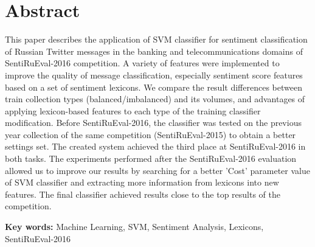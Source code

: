 \section{Abstract}
This paper describes the application of SVM classifier for sentiment
classification of Russian Twitter messages in the banking and telecommunications
domains of SentiRuEval-2016 competition. A variety of features were implemented
to improve the quality of message classification, especially sentiment score
features based on a set of sentiment lexicons. We compare the result differences
between train collection types (balanced/imbalanced) and its volumes, and
advantages of applying lexicon-based features to each type of the training
classifier modification. Before SentiRuEval-2016, the classifier was tested on
the previous year collection of the same competition (SentiRuEval-2015) to
obtain a better settings set. The created system achieved the third place at
SentiRuEval-2016 in both tasks. The experiments performed after the SentiRuEval-2016
evaluation allowed us to improve our results by searching for a better 'Cost'
parameter value of SVM classifier and extracting more information from lexicons
into new features. The final classifier achieved results close to the top results
of the competition.

{\bf Key words:} Machine Learning, SVM, Sentiment Analysis, Lexicons,
SentiRuEval-2016
